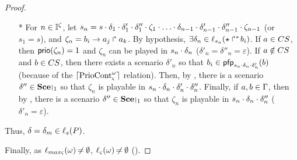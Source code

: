 \begin{proof}
\begin{itemize}
\begin{itemize}
\begin{itemize}
        \item[*] For $n \in \mathbb{I}^{\zeta}$, let $s_n = s \PHplay \delta_1 \PHplay \delta'_1 \PHplay \delta''_1 \PHplay \zeta_1 \PHplay \dots \PHplay \delta_{n-1} \PHplay \delta'_{n-1} \PHplay \delta''_{n-1} \PHplay \zeta_{n-1}$ (or $s_1 = s$),
          and $\zeta_n = b_i\rightarrow a_j\Rsh a_k$.
          By hypothesis, $\exists \delta_n \in \ell_{s_n}(\mbox{$\star\Rsh^*\!b_i$})$.
          If $a \in CS$, then $\mathsf{prio}(\zeta_n) = 1$ and $\zeta_n$ can be played in $s_n \cdot \delta_n$ (\ie $\delta'_n = \delta''_n = \varepsilon$).
          If $a \notin CS$ and $b \in CS$, then there exists a scenario $\delta'_n$ so that $b_i \in \mathsf{pfp}_{s_n \cdot \delta_n \cdot \delta'_n}(b)$ (because of the $\lceil \mathrm{PrioCont}^\omega_\varsigma\rceil$ relation).
          Then, by , there is a scenario $\delta'' \in \restriction{\Sce}{1}$ so that $\zeta_n$ is playable in $s_n \cdot \delta_n \cdot \delta'_n \cdot \delta''_n$.
          Finally, if $a,b \in \Gamma$, then by , there is a scenario $\delta'' \in \restriction{\Sce}{1}$ so that $\zeta_n$ is playable in $s_n \cdot \delta_n \cdot \delta''_n$ (\ie $\delta'_n = \varepsilon$).
      \end{itemize}
      Thus, $\delta = \delta_m \in \ell_s(P)$. %
  \end{itemize}
\end{itemize}

Finally, as $\ell_{max\varsigma}(\omega) \not\nobreak\mkern -2mu = \emptyset$, $\ell_\varsigma(\omega) \not\nobreak\mkern -2mu = \emptyset$ ().
\end{proof}



\begin{comment}
Voisinage :
\begin{equation*}
\begin{split}
    V: \wp(\PHproc) \times \segm{1}{k} &\rightarrow \wp(\PHh) \\
    (ps; m) &\mapsto \sfp{\PHh^{(m)+}_{cibles}(ps)}{hs}{\PHh^{(m)+)}_{bonds}(\widehat{B}(hs)) \cup hs)}
  \end{split}
\end{equation*}
where:
\begin{equation*}
\begin{split}
    \widehat{B}: \wp(\PHh) &\rightarrow \wp(\PHproc) \\
    hs &\mapsto \{ \PHhitter(h) \mid h \in hs \} \cup \{ \PHtarget(h) \mid h \in hs \}
  \end{split}
\end{equation*}
\begin{equation*}
\begin{split}
    \PHh^{(m)+}_{\mathsf{ref}}: \wp(\PHproc) &\rightarrow \wp(\PHh) \quad,\quad m \in \segm{0}{k} \text{ and } \mathsf{ref} \in \{ \PHhitter, \PHtarget, \PHbounce \} \\
    ps &\mapsto \{ h \in \PHh \mid \mathsf{ref}(h) \in ps \wedge \prio(h) \leq m \}
  \end{split}
\end{equation*}
\end{comment}



